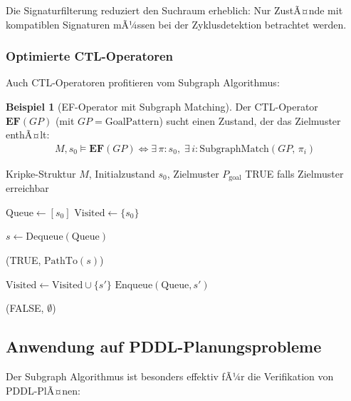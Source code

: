 ﻿\documentclass[a4paper,12pt]{article}
\theoremstyle{definition}
\newtheorem{beispiel}{Beispiel}[section]
\begin{document}
Die Signaturfilterung reduziert den Suchraum erheblich: Nur ZustÃ¤nde mit kompatiblen Signaturen mÃ¼ssen bei der Zyklusdetektion betrachtet werden.

\subsubsection{Optimierte CTL-Operatoren}

Auch CTL-Operatoren profitieren vom Subgraph Algorithmus:

\begin{beispiel}[EF-Operator mit Subgraph Matching]
	Der CTL-Operator $\mathbf{EF}(GP)$ (mit $GP = \text{GoalPattern}$)
	sucht einen Zustand, der das Zielmuster enthÃ¤lt:
	\begin{align}
	M, s_0 \models \mathbf{EF}(GP)
	\iff \exists\, \pi\colon s_0,\;
	      \exists\, i\colon \text{SubgraphMatch}(GP,\, \pi_i)
	\end{align}
\end{beispiel}

\begin{algorithm}[H]
	\caption{Musterbasierter EF-Operator}
	\label{alg:ef_pattern}
	\begin{algorithmic}[1]
		\Eingabe Kripke-Struktur $M$, Initialzustand $s_0$, Zielmuster $P_{\text{goal}}$
		\Ausgabe TRUE falls Zielmuster erreichbar
		
		\State $\text{Queue} \gets [s_0]$
		\State $\text{Visited} \gets \{s_0\}$
		
		\State $s \gets \text{Dequeue}(\text{Queue})$
		
		\State \Return (TRUE, $\text{PathTo}(s)$)
		\EndeWenn
		
		\State $\text{Visited} \gets \text{Visited} \cup \{s'\}$
		\State $\text{Enqueue}(\text{Queue}, s')$
		\EndeWenn
		\EndeFuer
		\EndeWaehrend
		
		\State \Return (FALSE, $\emptyset$)
	\end{algorithmic}
\end{algorithm}

\subsection{Anwendung auf PDDL-Planungsprobleme}

Der Subgraph Algorithmus ist besonders effektiv fÃ¼r die Verifikation von PDDL-PlÃ¤nen:
\end{document}
